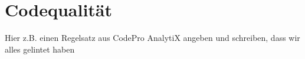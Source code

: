\chapter{Codequalität}
Hier z.B. einen Regelsatz aus CodePro AnalytiX angeben und schreiben, dass wir alles gelintet haben
